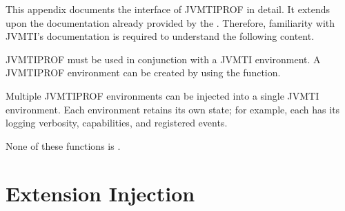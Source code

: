  \label{chap:api}

This appendix documents the interface of JVMTIPROF in detail. It extends upon the documentation already provided by the . Therefore, familiarity with JVMTI's documentation is required to understand the following content.

\medskip
JVMTIPROF must be used in conjunction with a JVMTI environment. A JVMTIPROF environment can be created by using the \hyperref[api:jvmtiProf_Create]{} function.

\medskip
Multiple JVMTIPROF environments can be injected into a single JVMTI environment. Each environment retains its own state; for example, each has its logging verbosity, capabilities, and registered events.

\medskip
None of these functions is .


\section{Extension Injection}

